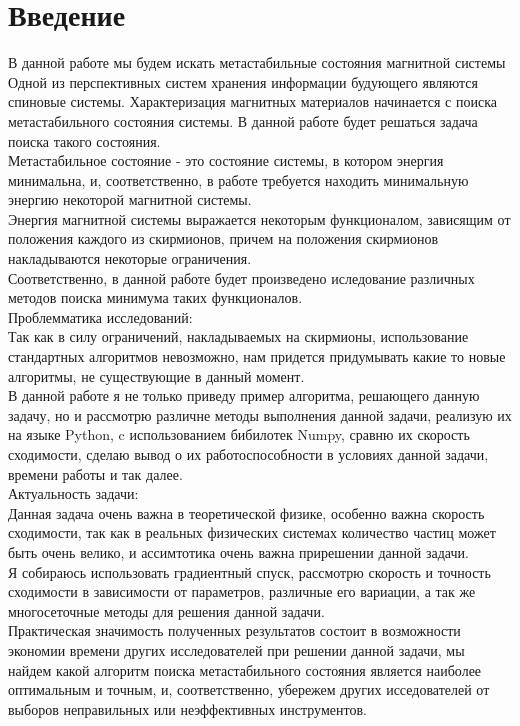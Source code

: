 \documentclass[ 12pt,x11names]{article}
\begin{document}
    \tableofcontents %
    \clearpage
    \section{Введение}    \noindent
    В данной работе мы будем искать метастабильные состояния магнитной системы\\
    Одной из перспективных систем хранения информации будующего являются спиновые системы.
    Характеризация магнитных материалов начинается с  поиска метастабильного состояния системы.
    В данной работе будет решаться задача поиска такого состояния.\\
        Метастабильное состояние - это состояние системы, в котором энергия минимальна, и, соответственно, в работе требуется находить минимальную энергию некоторой магнитной системы.\\
    Энергия магнитной системы выражается некоторым функционалом, зависящим от положения каждого из скирмионов, причем на положения скирмионов накладываются некоторые ограничения. \\Соответственно, в данной работе будет произведено иследование различных методов поиска минимума таких функционалов.\\
    Проблемматика исследований:\\
     Так как в силу ограничений, накладываемых на скирмионы, использование стандартных алгоритмов невозможно, нам придется придумывать какие то новые алгоритмы, не существующие в данный момент.\\
    В данной работе я не только приведу пример алгоритма, решающего данную задачу, но и   рассмотрю различне методы выполнения данной задачи, реализую их на языке Python, c использованием бибилотек Numpy, сравню их скорость сходимости, сделаю вывод о их работоспособности в условиях данной задачи, времени работы и так далее.\\
    Актуальность задачи:\\
    Данная задача очень важна в теоретической физике, особенно важна скорость сходимости, так как в реальных физических системах количество частиц может быть очень велико, и ассимтотика очень важна прирешении данной задачи.\\
    Я собираюсь использовать градиентный спуск, рассмотрю скорость и точность сходимости в зависимости от параметров, различные его вариации, а так же многосеточные методы для решения данной задачи.\\
     Практическая значимость полученных результатов состоит в возможности экономии времени других исследователей при решении данной задачи, мы найдем какой алгоритм поиска метастабильного состояния является наиболее оптимальным и точным, и, соответственно, убережем других исседователей от выборов неправильных или неэффективных инструментов.\\
\end{document}
